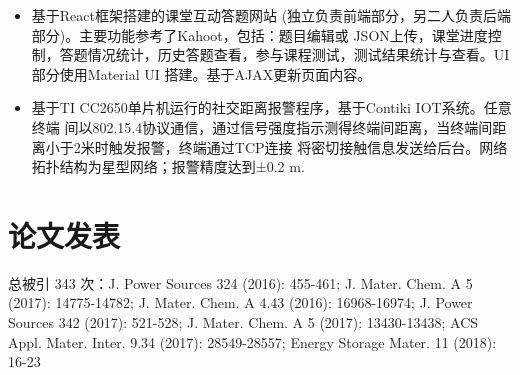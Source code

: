 \documentclass{resume}
\begin{document}
\begin{itemize}
  \item 基于React框架搭建的课堂互动答题网站 (独立负责前端部分，另二人负责后端部分)。主要功能参考了Kahoot，包括：题目编辑或
  JSON上传，课堂进度控制，答题情况统计，历史答题查看，参与课程测试，测试结果统计与查看。UI 部分使用Material UI 搭建。基于AJAX更新页面内容。
\end{itemize}

\begin{itemize}
  \item 基于TI CC2650单片机运行的社交距离报警程序，基于Contiki IOT系统。任意终端
  间以802.15.4协议通信，通过信号强度指示测得终端间距离，当终端间距离小于2米时触发报警，终端通过TCP连接
  将密切接触信息发送给后台。网络拓扑结构为星型网络；报警精度达到±0.2 m.
\end{itemize}


\section{论文发表}
 总被引 343 次：J. Power Sources 324 (2016): 455-461; J. Mater. Chem. A 5 (2017): 14775-14782; J. Mater. Chem. A 4.43
  (2016): 16968-16974; J. Power Sources 342 (2017): 521-528; J. Mater. Chem. A 5 (2017): 13430-13438; ACS
  Appl. Mater. Inter. 9.34 (2017): 28549-28557; Energy Storage Mater. 11 (2018): 16-23


\end{document}
